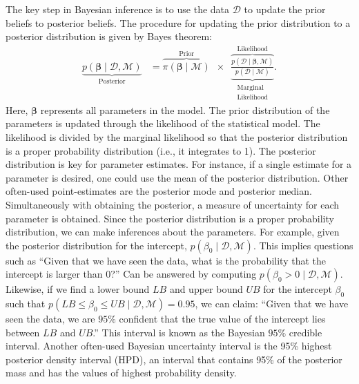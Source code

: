 \documentclass[a4paper]{article}
\newcommand{\prob}[1]{p\left(#1\right)}
\newcommand{\lik}[1]{p\left(#1\right)}
\newcommand{\data}{\mathcal{D}}
\newcommand{\model}{\mathcal{M}}
\newcommand{\prior}[1]{\pi\left(#1\right)}
\begin{document}
The key step in Bayesian inference is to use the data $\data$ to update the prior beliefs to posterior beliefs. The procedure for updating the prior distribution to a posterior distribution is given by Bayes theorem:
\begin{align*}\label{eq:BayesTheorem}
\underbrace{\prob{\bm{\beta} \mid \data , \model}}_{\text{Posterior}}
&= 
\overbrace{\prior{\bm{\beta}\mid \model}}^{\text{Prior}}
\enspace \times \enspace
\underbrace{\overbrace{
		\frac{\lik{\data \mid \bm{\beta}, \model}}{\prob{\data \mid \model}}
	}^{\text{Likelihood}}}_{\substack{\text{Marginal}\\ \text{Likelihood}}}.
\end{align*}
Here, $\bm{\beta}$ represents all parameters in the model. The prior distribution of the parameters is updated through the likelihood of the statistical model. The likelihood is divided by the marginal likelihood so that the posterior distribution is a proper probability distribution (i.e., it integrates to 1). The posterior distribution is key for parameter estimates. For instance, if a single estimate for a parameter is desired, one could use the mean of the posterior distribution. Other often-used point-estimates are the posterior mode and posterior median. Simultaneously with obtaining the posterior, a measure of uncertainty for each parameter is obtained. Since the posterior distribution is a proper probability distribution, we can make inferences about the parameters. For example, given the posterior distribution for the intercept, $\prob{\beta_0 \mid \data , \model}$. This implies questions such as ``Given that we have seen the data, what is the probability that the intercept is larger than 0?'' Can be answered by computing $\prob{\beta_0 > 0 \mid \data , \model}$. Likewise, if we find a lower bound $LB$ and upper bound $UB$ for the intercept $\beta_0$ such that $\prob{ LB \leq \beta_0 \leq UB \mid \data , \model} = 0.95$, we can claim: ``Given that we have seen the data, we are $95\%$ confident that the true value of the intercept lies between $LB$ and $UB$.'' This interval is known as the Bayesian $95\%$ credible interval. Another often-used Bayesian uncertainty interval is the 95\% highest posterior density interval (HPD), an interval that contains 95\% of the posterior mass and has the values of highest probability density.
\end{document}
